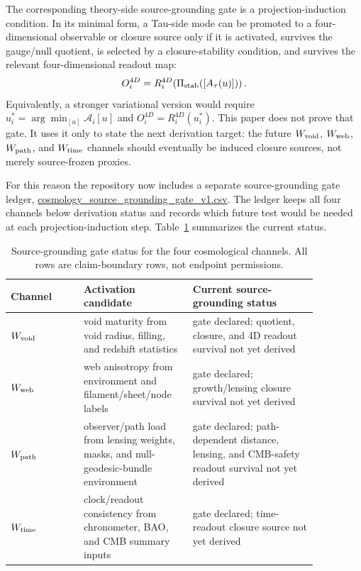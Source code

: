 \documentclass[11pt]{article}
\begin{document}
The corresponding theory-side source-grounding gate is a projection-induction
condition. In its minimal form, a Tau-side mode can be promoted to a
four-dimensional observable or closure source only if it is activated, survives
the gauge/null quotient, is selected by a closure-stability condition, and
survives the relevant four-dimensional readout map:
\begin{equation}
O_i^{4D}
=
R_i^{4D}\!\left(
\Pi_{\rm stab}([A_\tau(u)])
\right).
\end{equation}
Equivalently, a stronger variational version would require
\(u_i^\ast=\arg\min_{[u]}\mathcal A_i[u]\) and
\(O_i^{4D}=R_i^{4D}(u_i^\ast)\). This paper does not prove that gate. It uses
it only to state the next derivation target: the future \(W_{\rm void}\),
\(W_{\rm web}\), \(W_{\rm path}\), and \(W_{\rm time}\) channels should
eventually be induced closure sources, not merely source-frozen proxies.

For this reason the repository now includes a separate source-grounding gate
ledger, \url{cosmology_source_grounding_gate_v1.csv}.  The ledger
keeps all four channels below derivation status and records which future test
would be needed at each projection-induction step.  Table~\ref{tab:source-grounding-gate}
summarizes the current status.

\begin{table}[t]
\centering
\caption{Source-grounding gate status for the four cosmological channels.  All
rows are claim-boundary rows, not endpoint permissions.}
\label{tab:source-grounding-gate}
\footnotesize
\begin{tabular}{p{0.21\linewidth}p{0.29\linewidth}p{0.36\linewidth}}
\toprule
Channel & Activation candidate & Current source-grounding status\\
\midrule
\(W_{\rm void}\) & void maturity from void radius, filling, and redshift
statistics & gate declared; quotient, closure, and 4D readout survival not yet
derived\\
\(W_{\rm web}\) & web anisotropy from environment and filament/sheet/node labels
& gate declared; growth/lensing closure survival not yet derived\\
\(W_{\rm path}\) & observer/path load from lensing weights, masks, and
null-geodesic-bundle environment & gate declared; path-dependent distance,
lensing, and CMB-safety readout survival not yet derived\\
\(W_{\rm time}\) & clock/readout consistency from chronometer, BAO, and CMB
summary inputs & gate declared; time-readout closure source not yet derived\\
\bottomrule
\end{tabular}
\end{table}
\end{document}
